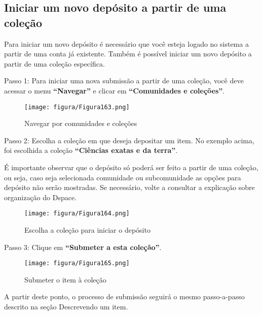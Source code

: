\documentclass[12pt,hidelinks]{article}
\begin{document}
    \subsection{Iniciar um novo depósito a partir de uma coleção}
    
    Para iniciar um novo depósito é necessário que você esteja logado no sistema a partir de uma conta já existente. Também é possível iniciar um novo depósito a partir de uma coleção específica.
    
    \singlespacing
    
    Passo 1: Para iniciar uma nova submissão a partir de uma coleção, você deve acessar o menu \textbf{“Navegar”} e clicar em \textbf{“Comunidades e coleções”}.
    
    \begin{figure}[!htp]
                \centering
                \texttt{[image: figura/Figura163.png]}
                \caption{Navegar por comunidades e coleções}
            \label{Rotulo}
        \end{figure}
    
    Passo 2: Escolha a coleção em que deseja depositar um item. No exemplo acima, foi escolhida a coleção \textbf{“Ciências exatas e da terra”}.

\newpage

    É importante observar que o depósito só poderá ser feito a partir de uma coleção, ou seja, caso seja selecionada comunidade ou subcomunidade as opções para depósito não serão mostradas. Se necessário, volte a consultar a explicação sobre organização do Dspace.
    
    \begin{figure}[!htp]
                \centering
                \texttt{[image: figura/Figura164.png]}
                \caption{Escolha a coleção para iniciar o depósito}
            \label{Rotulo}
        \end{figure}
    
    Passo 3: Clique em \textbf{“Submeter a esta coleção”}.
    
    \begin{figure}[!htp]
                \centering
                \texttt{[image: figura/Figura165.png]}
                \caption{Submeter o item à coleção}
            \label{Rotulo}
        \end{figure}
    
    A partir deste ponto, o processo de submissão seguirá o mesmo passo-a-passo descrito na seção Descrevendo um item. 
    
\end{document}
